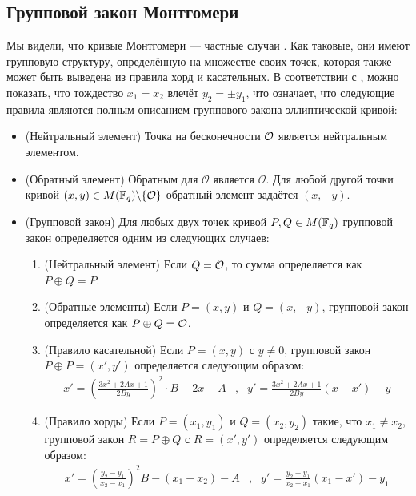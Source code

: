 \subsection{Групповой закон Монтгомери} Мы видели, что кривые Монтгомери — частные случаи . Как таковые, они имеют групповую структуру, определённую на множестве своих точек, которая также может быть выведена из правила хорд и касательных. В соответствии с , можно показать, что тождество $x_1=x_2$ влечёт $y_2=\pm y_1$, что означает, что следующие правила являются полным описанием группового закона эллиптической кривой:

\begin{definition}\label{def:montgomery-group-law}

\begin{itemize}
\item (Нейтральный элемент) Точка на бесконечности $\mathcal{O}$ является нейтральным элементом.
\item (Обратный элемент) Обратным для $\mathcal{O}$ является $\mathcal{O}$. Для любой другой точки кривой $(x,y) \in M(\mathbb{F}_q)\backslash \{\mathcal{O}\}$ обратный элемент задаётся $(x,-y)$.
\item (Групповой закон) Для любых двух точек кривой $P, Q \in M(\mathbb{F}_q)$ групповой закон определяется одним из следующих случаев:
\begin{enumerate}
\item (Нейтральный элемент) Если $Q=\mathcal{O}$, то сумма определяется как $P\oplus Q=P$.
\item (Обратные элементы) Если $P=(x,y)$ и $Q=(x,-y)$, групповой закон определяется как $P\oplus Q=\mathcal{O}$.
\item (Правило касательной) Если $P=(x,y)$ с $y\neq 0$, групповой закон $P\oplus P=(x',y')$ определяется следующим образом:
$$
\begin{array}{llr}
x' = (\frac{3x^2 + 2A x +1}{2By})^2\cdot B - 2x - A &,&
y' = \frac{3x^2 + 2A x +1}{2By}(x-x') - y
\end{array} 
$$
\item (Правило хорды) Если $P=(x_1,y_1)$ и $Q=(x_2,y_2)$ такие, что $x_1 \neq x_2$, групповой закон $R=P\oplus Q$ с $R=(x',y')$ определяется следующим образом:
$$
\begin{array}{llr}
x' = (\frac{y_2-y_1}{x_2-x_1})^2B - (x_1 + x_2) - A &, &
y' = \frac{y_2-y_1}{x_2-x_1}(x_1-x') - y_1
\end{array} 
$$
\end{enumerate}
\end{itemize}
\end{definition}
